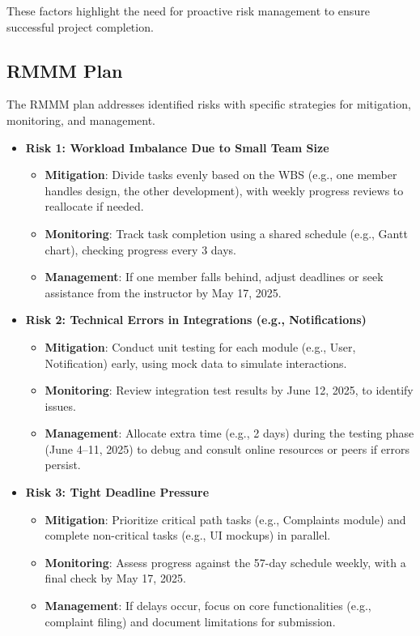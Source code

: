 \documentclass[a4paper,12pt]{article}
\begin{document}
These factors highlight the need for proactive risk management to ensure successful project completion.

\subsection{ RMMM Plan}

The RMMM plan addresses identified risks with specific strategies for mitigation, monitoring, and management.

\begin{itemize}
    \item \textbf{Risk 1: Workload Imbalance Due to Small Team Size}
    \begin{itemize}
        \item \textbf{Mitigation}: Divide tasks evenly based on the WBS (e.g., one member handles design, the other development), with weekly progress reviews to reallocate if needed.
        \item \textbf{Monitoring}: Track task completion using a shared schedule (e.g., Gantt chart), checking progress every 3 days.
        \item \textbf{Management}: If one member falls behind, adjust deadlines or seek assistance from the instructor by May 17, 2025.
    \end{itemize}
    
    \item \textbf{Risk 2: Technical Errors in Integrations (e.g., Notifications)}
    \begin{itemize}
        \item \textbf{Mitigation}: Conduct unit testing for each module (e.g., User, Notification) early, using mock data to simulate interactions.
        \item \textbf{Monitoring}: Review integration test results by June 12, 2025, to identify issues.
        \item \textbf{Management}: Allocate extra time (e.g., 2 days) during the testing phase (June 4–11, 2025) to debug and consult online resources or peers if errors persist.
    \end{itemize}
    
    \item \textbf{Risk 3: Tight Deadline Pressure}
    \begin{itemize}
        \item \textbf{Mitigation}: Prioritize critical path tasks (e.g., Complaints module) and complete non-critical tasks (e.g., UI mockups) in parallel.
        \item \textbf{Monitoring}: Assess progress against the 57-day schedule weekly, with a final check by May 17, 2025.
        \item \textbf{Management}: If delays occur, focus on core functionalities (e.g., complaint filing) and document limitations for submission.
    \end{itemize}
    

\end{itemize}
\end{document}
